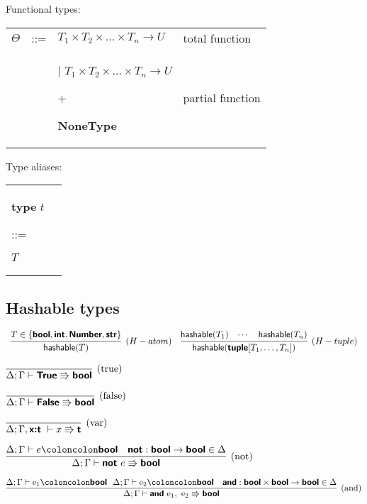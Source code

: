 \documentclass[a4paper]{article}
\newcommand{\kw}[1]{\textsf{\textbf{#1}}}
\newcommand{\code}[1]{\begin{sffamily}#1\end{sffamily}}
\newcommand{\colcol}{\coloncolon}
\newcommand{\yield}{\Rrightarrow}
\newcommand{\fun}[1]{\mathsf{#1}}
\begin{document}
Functional types:

\begin{tabular}{llll}
$\Theta$ & ::= & $T_1 \times T_2 \times \ldots \times T_n \rightarrow U$ & total function \\
  & & | $T_1 \times T_2 \times \ldots \times T_n \rightarrow U$ \code{+} \kw{NoneType} & partial function \\
\end{tabular}

Type aliases:

\begin{tabular}{ll}
\kw{type} $t$ \code{::=} $T$
\end{tabular}

\subsection{Hashable types}


$$\begin{array}{cc}
\infer[(H-atom)]{\fun{hashable}(T)}{T \in \{\kw{bool},\kw{int},\kw{Number},\kw{str}\}}
&
\infer[(H-tuple)]{\fun{hashable}(\kw{tuple}[T_1,\ldots,T_n])}{\fun{hashable}(T_1) & \cdots & \fun{hashable}(T_n)}
\end{array}
$$

\vspace{1\baselineskip}

$\infer[\text{(true)}]%
{\Delta;\Gamma \vdash \kw{True} \yield \kw{bool}}%
{}$

\vspace{3\baselineskip}

$\infer[\text{(false)}]%
{\Delta;\Gamma \vdash \kw{False} \yield \kw{bool}}%
{}$

\vspace{3\baselineskip}


$\infer[\text{(var)}]%
{\Delta;\Gamma, \kw{x:t}~ \vdash x \yield \kw{t}}%
{}$

\vspace{3\baselineskip}

$\infer[\text{(not)}]%
{\Delta;\Gamma \vdash \kw{not}~e \yield \kw{bool}}%
{\Delta;\Gamma \vdash e \colcol \kw{bool} & \kw{not}:\kw{bool}\rightarrow\kw{bool}\in \Delta}$

\vspace{3\baselineskip}

$\infer[\text{(and)}]%
{\Delta;\Gamma \vdash \kw{and}~\textrm{e}_\textrm{1},~\textrm{e}_\textrm{2} \yield \kw{bool}}%
{\Delta;\Gamma \vdash \textrm{e}_\textrm{1} \colcol \kw{bool}~~ \Delta;\Gamma \vdash\textrm{e}_\textrm{2} \colcol \kw{bool} & \kw{and}:\kw{bool}\times\kw{bool}\rightarrow\kw{bool}\in \Delta}$
\end{document}
